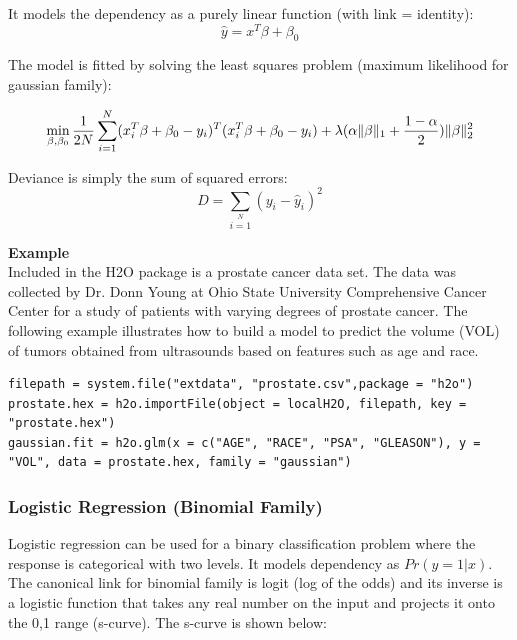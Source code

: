 \documentclass[11pt]{article}
\begin{document}
It models the dependency as a purely linear function (with link = identity):
\[ \hat{y} = x^T\beta + \beta_0\]

The model is fitted by solving the least squares problem (maximum likelihood for gaussian family):

\[ \min\limits_{\beta,\beta_0} { {1 \over 2N}\sum\limits_{i=1}\limits^{N}(x_i^{T}\beta  + \beta_0- y_i)^T (x_i^{T}\beta + \beta_0 - y_i)  + \lambda (\alpha \|\beta \|_1 + {1-\alpha \over 2}) \| \beta \|_2^2} \]


Deviance is simply the sum of squared errors:
\[ D = \sum\limits_{i=1}\limits^{N}{(y_i - \hat{y}_i)^2} \]


\textbf{Example}\\

Included in the H2O package is a prostate cancer data set. The data was collected by Dr. Donn Young at  Ohio State University Comprehensive Cancer Center for a study of patients with varying degrees of prostate cancer. The following example illustrates how to build a model to predict the volume (VOL) of tumors obtained from ultrasounds based on features such as age and race.

\begin{lstlisting}[style=R]
filepath = system.file("extdata", "prostate.csv",package = "h2o")
prostate.hex = h2o.importFile(object = localH2O, filepath, key = "prostate.hex")
gaussian.fit = h2o.glm(x = c("AGE", "RACE", "PSA", "GLEASON"), y = "VOL", data = prostate.hex, family = "gaussian")
\end{lstlisting}

\subsubsection{Logistic Regression (Binomial Family)}
Logistic regression can be used for a binary classification problem where the response is categorical with two levels. It models dependency as $Pr(y = 1|x)$. The canonical link for binomial family is logit (log of the odds) and its inverse is a logistic function that takes any real number on the input and projects it onto the 0,1 range (s-curve).  The s-curve is shown below: 
\end{document}
